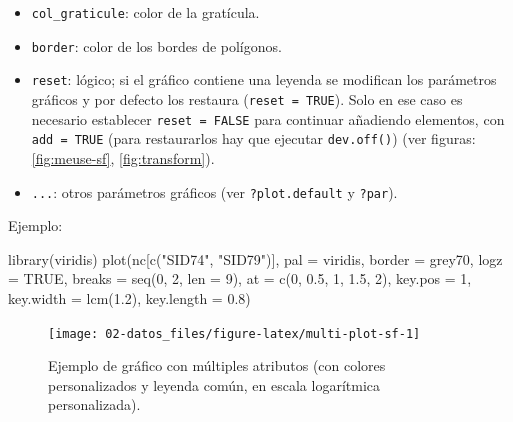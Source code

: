 \documentclass[
  spanish,
]{book}
\newenvironment{Shaded}{\begin{snugshade}}{\end{snugshade}}
\newcommand{\AttributeTok}[1]{\textcolor[rgb]{0.77,0.63,0.00}{#1}}
\newcommand{\ConstantTok}[1]{\textcolor[rgb]{0.00,0.00,0.00}{#1}}
\newcommand{\DecValTok}[1]{\textcolor[rgb]{0.00,0.00,0.81}{#1}}
\newcommand{\FloatTok}[1]{\textcolor[rgb]{0.00,0.00,0.81}{#1}}
\newcommand{\FunctionTok}[1]{\textcolor[rgb]{0.00,0.00,0.00}{#1}}
\newcommand{\NormalTok}[1]{#1}
\newcommand{\StringTok}[1]{\textcolor[rgb]{0.31,0.60,0.02}{#1}}
\theoremstyle{break}
\theoremstyle{definition}
\theoremstyle{definition}
\theoremstyle{definition}
\theoremstyle{definition}
\theoremstyle{remark}
\begin{document}
\begin{itemize}
\item
  \texttt{col\_graticule}: color de la gratícula.
\item
  \texttt{border}: color de los bordes de polígonos.
\item
  \texttt{reset}: lógico; si el gráfico contiene una leyenda se modifican los parámetros gráficos y por defecto los restaura (\texttt{reset\ =\ TRUE}). Solo en ese caso es necesario establecer \texttt{reset\ =\ FALSE} para continuar añadiendo elementos, con \texttt{add\ =\ TRUE} (para restaurarlos hay que ejecutar \texttt{dev.off()}) (ver figuras: \ref{fig:meuse-sf}, \ref{fig:transform}).
\item
  \texttt{...}: otros parámetros gráficos (ver \texttt{?plot.default} y \texttt{?par}).
\end{itemize}

Ejemplo:

\begin{Shaded}
\begin{Highlighting}[]
\FunctionTok{library}\NormalTok{(viridis)}
\FunctionTok{plot}\NormalTok{(nc[}\FunctionTok{c}\NormalTok{(}\StringTok{"SID74"}\NormalTok{, }\StringTok{"SID79"}\NormalTok{)], }\AttributeTok{pal =}\NormalTok{ viridis, }\AttributeTok{border =} \StringTok{\textquotesingle{}grey70\textquotesingle{}}\NormalTok{, }\AttributeTok{logz =} \ConstantTok{TRUE}\NormalTok{, }
     \AttributeTok{breaks =} \FunctionTok{seq}\NormalTok{(}\DecValTok{0}\NormalTok{, }\DecValTok{2}\NormalTok{, }\AttributeTok{len =} \DecValTok{9}\NormalTok{), }\AttributeTok{at =} \FunctionTok{c}\NormalTok{(}\DecValTok{0}\NormalTok{, }\FloatTok{0.5}\NormalTok{, }\DecValTok{1}\NormalTok{, }\FloatTok{1.5}\NormalTok{, }\DecValTok{2}\NormalTok{), }
     \AttributeTok{key.pos =} \DecValTok{1}\NormalTok{, }\AttributeTok{key.width =} \FunctionTok{lcm}\NormalTok{(}\FloatTok{1.2}\NormalTok{), }\AttributeTok{key.length =} \FloatTok{0.8}\NormalTok{) }
\end{Highlighting}
\end{Shaded}

\begin{figure}[!htb]

{\centering \texttt{[image: 02-datos\_files/figure-latex/multi-plot-sf-1]} 

}

\caption{Ejemplo de gráfico con múltiples atributos (con colores personalizados y leyenda común, en escala logarítmica personalizada).}\label{fig:multi-plot-sf}
\end{figure}
\end{document}
